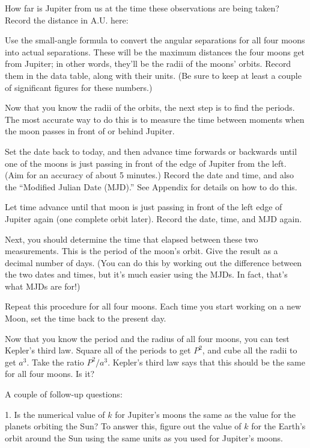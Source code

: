 How far is Jupiter from us at the time these observations are being taken?
Record the distance in A.U. here:

\answerspace{1in}

Use the small-angle formula to convert the angular separations
for all four moons into actual separations.  These will be the
maximum distances the four moons get from Jupiter; in other words,
they'll be the radii of the moons' orbits.  Record them in the data table,
along with their units. (Be sure to keep at least a couple of significant
figures for these numbers.)

Now that you know the radii of the orbits, the next step is to find the
periods.  The most accurate way to do this is to measure the time between
moments when the moon passes in front of or behind Jupiter.

Set the date back to today, and then advance time
forwards or backwards until one of the moons is just
passing in front of the edge of Jupiter from the left.  (Aim for
an accuracy of about 5 minutes.)  Record
the date and time, and also the ``Modified Julian Date (MJD).''
See Appendix \label{app:stellarium} for details on how to do this.

Let time advance until that moon
is just passing in front of the left edge of Jupiter again (one complete
orbit later).  Record the date, time, and MJD again.  

Next, you should determine the time that elapsed
between these two measurements.  This is the period of the moon's orbit.
Give the result as a decimal number of days. (You can do this by working
out the difference between the two dates and times, but it's much easier
using the MJDs. In fact, that's what MJDs are for!)

Repeat this procedure for all four moons. Each time you start working on a
new Moon, set the time back to the present day.

Now that you know the period and the radius of all four moons,
you can test Kepler's third law.  Square all of the periods to get $P^2$,
and cube all the radii to get $a^3$.  Take the ratio $P^2/a^3$.
Kepler's third law says that this should be the same for all four
moons.  Is it?

\answerspace{1in}

A couple of follow-up questions:

1. Is the numerical value of $k$ for Jupiter's moons the same
as the value for the planets orbiting the Sun?  To answer this,
figure out the value of $k$ for the Earth's orbit around the
Sun using the same units as you used for Jupiter's moons.

